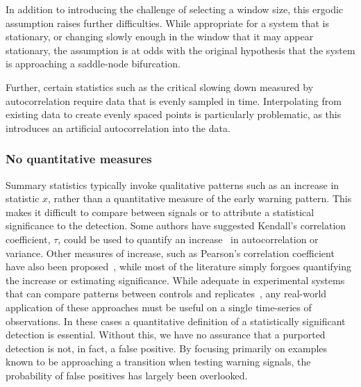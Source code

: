 \documentclass[authoryear,review,11pt]{elsarticle}
\begin{document}
In addition to introducing the challenge of selecting a window size,
this ergodic assumption raises further difficulties.
While appropriate for a system that is stationary,
or changing slowly enough in the window that it may appear stationary,
the assumption is at odds with the original hypothesis
that the system is approaching a saddle-node bifurcation.

Further, certain statistics such as the critical slowing down measured by autocorrelation
require data that is evenly sampled in time.
Interpolating from existing data to create evenly spaced points is particularly problematic,
as this introduces an artificial autocorrelation into the data.

\subsubsection*{No quantitative measures}
Summary statistics typically invoke qualitative patterns such as an increase in statistic $x$,
rather than a quantitative measure of the early warning pattern.
This makes it difficult to compare between signals or to
attribute a statistical significance to the detection.
Some authors have suggested Kendall's correlation coefficient,
$\tau$, could be used to quantify an increase~\citep{Dakos2008, Dakos2011}
in autocorrelation or variance.
Other measures of increase, such as Pearson's correlation coefficient have also been proposed~\citep{Drake2010},
while most of the literature simply forgoes quantifying the increase or estimating significance.
While adequate in experimental systems that can compare patterns between controls 
and replicates~\citep[\emph{e.g.}][]{Drake2010, Carpenter2011}, 
any real-world application of these approaches must be useful on a single time-series of observations.
In these cases a quantitative definition of a statistically significant detection is essential.
Without this, we have no assurance that a purported detection is not, in fact, a false positive. 
By focusing primarily on examples known to be approaching a transition when testing warning signals,
the probability of false positives has largely been overlooked.  
\end{document}
